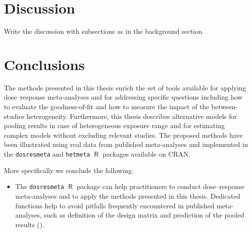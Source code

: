 \documentclass[11pt,a4paper,twoside,openany]{book}\usepackage{knitr}
\DeclareMathOperator{\R}{\textsf{R}}
\begin{document}
{%
%


%

\chapter{Discussion}

Write the discussion with subsections as in the background section


%

\chapter{Conclusions}

The methods presented in this thesis enrich the set of tools available for applying dose--response meta-analyses and for addressing specific questions including how to evaluate the goodness-of-fit and how to measure the impact of the between-studies heterogeneity. Furthermore, this thesis describes alternative models for pooling results in case of heterogeneous exposure range and for estimating complex models without excluding relevant studies. The proposed methods have been illustrated using real data from published meta-analyses and implemented in the \texttt{dosresmeta} and \texttt{hetmeta} $\R$ packages available on CRAN. 

More specifically we conclude the following:

\begin{itemize}

\item The \texttt{dosresmeta} $\R$ package can help practitioners to conduct dose--response meta-analyses and to apply the methods presented in this thesis. Dedicated functions help to avoid pitfalls frequently encountered in published meta-analyses, such as definition of the design matrix and prediction of the pooled results ().


\end{itemize}}
\end{document}

